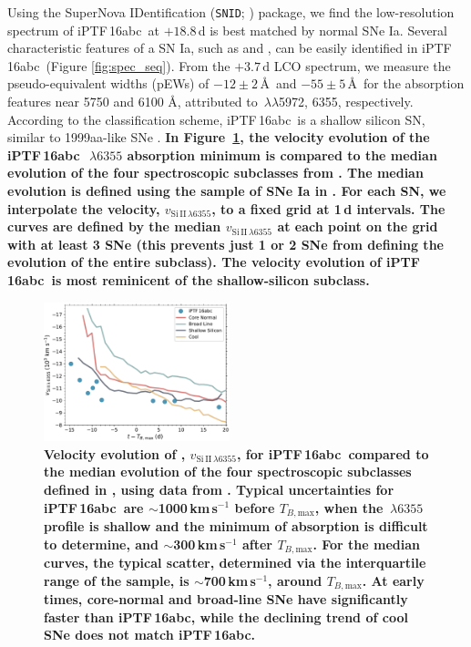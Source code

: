 \documentclass[twocolumn]{aastex61}
\newcommand{\abc}{iPTF\,16abc}
\begin{document}
Using the SuperNova IDentification (\texttt{SNID};
\citealt{2007ApJ...666.1024B}) package, we find the low-resolution spectrum of
\abc\ at $+18.8$\,d is best matched by normal SNe Ia. Several characteristic
features of a SN Ia, such as  and , can be easily
identified in \abc\ (Figure \ref{fig:spec_seq}). From the $+3.7 \, \mathrm{d}$
LCO spectrum, we measure the pseudo-equivalent widths (pEWs) of $-12 \pm
2$\,\AA\ and $-55 \pm 5$\,\AA\ for the absorption features near 5750 and 6100
\AA, attributed to \,$\lambda\lambda$5972, 6355, respectively.
According to the \citet{2006PASP..118..560B} classification scheme, \abc\ is a
shallow silicon SN, similar to 1999aa-like SNe \citep{2009PASP..121..238B}.
\textbf{In Figure~\ref{fig:branch_vel}, the velocity evolution of the \abc\
$\,\lambda6355$ absorption minimum is compared to the median
evolution of the four spectroscopic subclasses from
\citet{2006PASP..118..560B}. The median evolution is defined using the sample
of SNe Ia in \citet{2012AJ....143..126B}. For each SN, we interpolate the
\ion{Si}{2} velocity, $v_{\mathrm{Si\,II}\,\lambda6355}$, to a fixed grid at
1\,d intervals. The curves are defined by the median
$v_{\mathrm{Si\,II}\,\lambda6355}$ at each point on the grid with at least 3
SNe (this prevents just 1 or 2 SNe from defining the evolution of the entire
subclass). The velocity evolution of \abc\ is most reminicent of the
shallow-silicon subclass.}

\begin{figure}[htb]
  \centering
  \includegraphics[width=0.48\textwidth]{Branch_vel_evol.pdf}
  \caption{
  \textbf{Velocity evolution of ,
  $v_{\mathrm{Si\,II}\,\lambda6355}$, for \abc\ compared to the median
  evolution of the four spectroscopic subclasses defined in
  \citet{2006PASP..118..560B}, using data from \citet{2012AJ....143..126B}.
  Typical uncertainties for \abc\ are $\sim$1000\,km\,s$^{-1}$ before
  $T_{B,\mathrm{max}}$, when the \ion{Si}{2}$\,\lambda6355$ profile is shallow
  and the minimum of absorption is difficult to determine, and
  $\sim$300\,km\,s$^{-1}$ after $T_{B,\mathrm{max}}$. For the median curves,
  the typical scatter, determined via the interquartile range of the sample,
  is $\sim$700\,km\,s$^{-1}$, around $T_{B,\mathrm{max}}$. At early times,
  core-normal and broad-line SNe have significantly faster \ion{Si}{2} than
  \abc, while the declining trend of cool SNe does not match \abc.} }
  \label{fig:branch_vel}
\end{figure}
\end{document}
